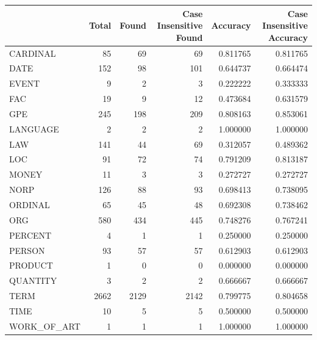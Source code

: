 \begin{tabular}{lrrrrr}
\toprule
 & Total & Found & Case Insensitive Found & Accuracy & Case Insensitive Accuracy \\
\midrule
CARDINAL & 85 & 69 & 69 & 0.811765 & 0.811765 \\
DATE & 152 & 98 & 101 & 0.644737 & 0.664474 \\
EVENT & 9 & 2 & 3 & 0.222222 & 0.333333 \\
FAC & 19 & 9 & 12 & 0.473684 & 0.631579 \\
GPE & 245 & 198 & 209 & 0.808163 & 0.853061 \\
LANGUAGE & 2 & 2 & 2 & 1.000000 & 1.000000 \\
LAW & 141 & 44 & 69 & 0.312057 & 0.489362 \\
LOC & 91 & 72 & 74 & 0.791209 & 0.813187 \\
MONEY & 11 & 3 & 3 & 0.272727 & 0.272727 \\
NORP & 126 & 88 & 93 & 0.698413 & 0.738095 \\
ORDINAL & 65 & 45 & 48 & 0.692308 & 0.738462 \\
ORG & 580 & 434 & 445 & 0.748276 & 0.767241 \\
PERCENT & 4 & 1 & 1 & 0.250000 & 0.250000 \\
PERSON & 93 & 57 & 57 & 0.612903 & 0.612903 \\
PRODUCT & 1 & 0 & 0 & 0.000000 & 0.000000 \\
QUANTITY & 3 & 2 & 2 & 0.666667 & 0.666667 \\
TERM & 2662 & 2129 & 2142 & 0.799775 & 0.804658 \\
TIME & 10 & 5 & 5 & 0.500000 & 0.500000 \\
WORK_OF_ART & 1 & 1 & 1 & 1.000000 & 1.000000 \\
\bottomrule
\end{tabular}
